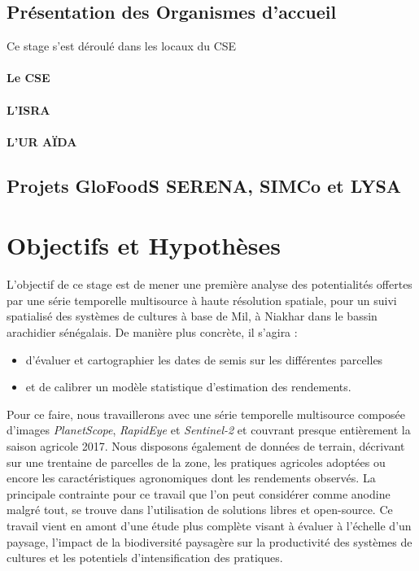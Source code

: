   \subsection{Présentation des Organismes d'accueil}
Ce stage s'est déroulé dans les locaux du CSE
    \paragraph{Le CSE}
    
    \paragraph{L'ISRA}
    
    \paragraph{L'UR AÏDA}
  
  \subsection{Projets GloFoodS SERENA, SIMCo et LYSA}

\section{Objectifs et Hypothèses}

L'objectif de ce stage est de mener une première analyse des potentialités offertes par une série temporelle multisource à haute résolution spatiale, pour un suivi spatialisé des 
systèmes de cultures à base de Mil, à Niakhar dans le bassin arachidier sénégalais. De manière plus concrète, il s'agira :
  \begin{itemize}
   \item d'évaluer et cartographier les dates de semis sur les différentes parcelles
   \item et de calibrer un modèle statistique d'estimation des rendements.
  \end{itemize}
 
\vspace{5mm} %

Pour ce faire, nous travaillerons avec une série temporelle multisource composée d'images \emph{PlanetScope}, \emph{RapidEye} et \emph{Sentinel-2} et couvrant presque entièrement 
la saison agricole 2017. Nous disposons également de données de terrain, décrivant sur une trentaine de parcelles de la zone, les pratiques agricoles adoptées ou encore les 
caractéristiques agronomiques dont les rendements observés. La principale contrainte pour ce travail que l'on peut considérer comme anodine malgré tout, se trouve dans l'utilisation 
de solutions libres et open-source. Ce travail vient en amont d'une étude plus complète visant à évaluer à l’échelle d’un paysage, l’impact de la biodiversité paysagère sur la productivité des 
systèmes de cultures et les potentiels d’intensification des pratiques.

